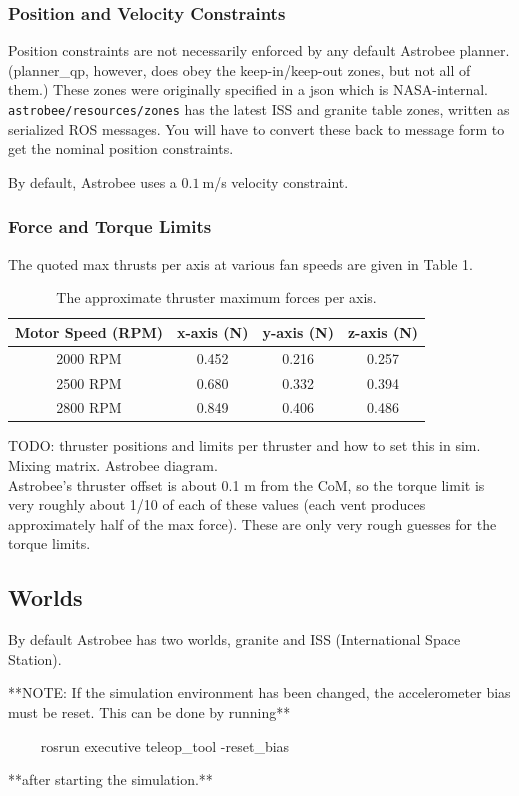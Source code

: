 \documentclass{article}
\begin{document}
\subsubsection{Position and Velocity Constraints}

Position constraints are not necessarily enforced by any default Astrobee planner. (planner\_qp, however, does obey the keep-in/keep-out zones, but not all of them.) These zones were originally specified in a json which is NASA-internal. \texttt{astrobee/resources/zones} has the latest ISS and granite table zones, written as serialized ROS messages. You will have to convert these back to message form to get the nominal position constraints.

By default, Astrobee uses a $0.1\ $m/s velocity constraint.

\subsubsection{Force and Torque Limits}

The quoted max thrusts per axis at various fan speeds are given in Table 1.

\begin{table}[h!]
\centering
\begin{tabular}{ |c|c|c|c| } 
    \hline
    Motor Speed (RPM)& x-axis (N)& y-axis (N)& z-axis (N) \\
    \hline
    2000 RPM & 0.452 & 0.216 & 0.257 \\
     \hline
    2500 RPM & 0.680 & 0.332 & 0.394 \\
     \hline
    2800 RPM & 0.849 & 0.406 & 0.486 \\
     \hline
\end{tabular}
     \label{table:speeds}
     \caption{The approximate thruster maximum forces per axis.}
\end{table}
     
TODO: thruster positions and limits per thruster and how to set this in sim. Mixing matrix. Astrobee diagram.
\\

Astrobee's thruster offset is about 0.1 m from the CoM, so the torque limit is very roughly about 1/10 of each of these values (each vent produces approximately half of the max force). These are only very rough guesses for the torque limits.

\subsection{Worlds}
By default Astrobee has two worlds, granite and ISS (International Space Station).
\begin{markdown}
**NOTE: If the simulation environment has been changed, the accelerometer bias must be reset. This can be done by running**

~~~~
rosrun executive teleop_tool -reset_bias
~~~~

**after starting the simulation.**
\end{markdown}
\end{document}
